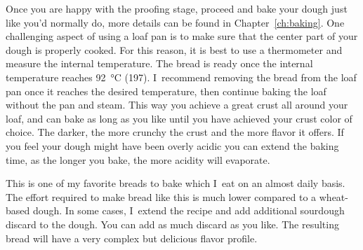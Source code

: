 Once you are happy with the proofing stage, proceed and bake your dough
just like you'd normally do, more details can be found in
Chapter~\ref{ch:baking}. One challenging aspect
of using a loaf pan is to make sure that the center part of your
dough is properly cooked. For this reason, it is best to use a thermometer
and measure the internal temperature. The bread is ready once the internal
temperature reaches \qty{92}{\degreeCelsius} (\qty{197}{\degF}). I~recommend
removing the bread from the loaf pan once it reaches the desired temperature,
then continue baking the loaf without the pan and steam. This way you achieve
a great crust all around your loaf, and can bake as long as you like until you
have achieved your crust color of choice. The darker, the more crunchy
the crust and the more flavor it offers. If you feel your dough might have
been overly acidic you can extend the baking time, as the longer you bake, the
more acidity will evaporate.

This is one of my favorite breads to bake which I~eat on an
almost daily basis. The effort required to make bread like
this is much lower compared to a wheat-based dough. In some
cases, I~extend the recipe and add additional sourdough discard
to the dough. You can add as much discard as you like. The resulting
bread will have a very complex but delicious flavor profile.
